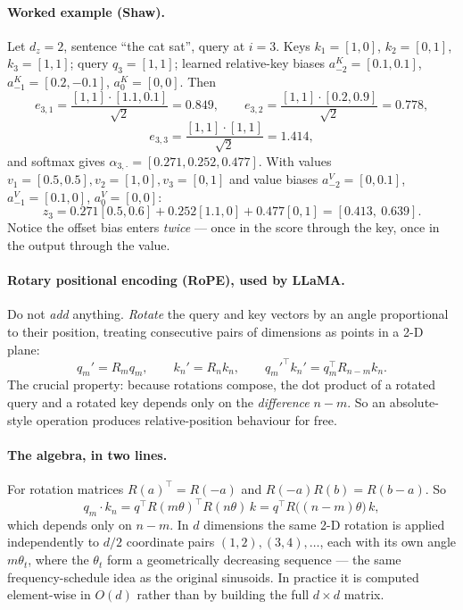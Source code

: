 \documentclass[11pt,a4paper]{article}
\begin{document}
\paragraph{Worked example (Shaw).} Let $d_z = 2$, sentence ``the cat sat'', query at $i = 3$.
Keys $k_1 = [1,0]$, $k_2 = [0,1]$, $k_3 = [1,1]$; query $q_3 = [1,1]$; learned relative-key
biases $a^K_{-2} = [0.1, 0.1]$, $a^K_{-1} = [0.2, -0.1]$, $a^K_{0} = [0,0]$. Then
\[
e_{3,1} = \frac{[1,1]\cdot[1.1, 0.1]}{\sqrt2} = 0.849, \qquad
e_{3,2} = \frac{[1,1]\cdot[0.2, 0.9]}{\sqrt2} = 0.778,
\]
\[
e_{3,3} = \frac{[1,1]\cdot[1,1]}{\sqrt2} = 1.414,
\]
and softmax gives $\alpha_{3,\cdot} = [0.271, 0.252, 0.477]$. With values
$v_1 = [0.5,0.5], v_2 = [1,0], v_3 = [0,1]$ and value biases
$a^V_{-2} = [0, 0.1]$, $a^V_{-1} = [0.1, 0]$, $a^V_0 = [0,0]$:
\[
z_3 = 0.271[0.5, 0.6] + 0.252[1.1, 0] + 0.477[0, 1] = [0.413,\ 0.639].
\]
Notice the offset bias enters \emph{twice} --- once in the score through the key, once in the
output through the value.

\paragraph{Rotary positional encoding (RoPE), used by LLaMA.} Do not \emph{add} anything.
\emph{Rotate} the query and key vectors by an angle proportional to their position, treating
consecutive pairs of dimensions as points in a 2-D plane:
\[
q_m' = R_m q_m, \qquad k_n' = R_n k_n, \qquad
q_m'^\top k_n' = q_m^\top R_{n-m} k_n .
\]
The crucial property: because rotations compose, the dot product of a rotated query and a
rotated key depends only on the \emph{difference} $n - m$. So an absolute-style operation
produces relative-position behaviour for free.

\paragraph{The algebra, in two lines.} For rotation matrices $R(a)^\top = R(-a)$ and
$R(-a)R(b) = R(b-a)$. So
\[
q_m \cdot k_n = q^\top R(m\theta)^\top R(n\theta)\, k = q^\top R\big((n-m)\theta\big)\, k,
\]
which depends only on $n - m$. In $d$ dimensions the same 2-D rotation is applied
independently to $d/2$ coordinate pairs $(1,2), (3,4), \ldots$, each with its own angle
$m\theta_t$, where the $\theta_t$ form a geometrically decreasing sequence --- the same
frequency-schedule idea as the original sinusoids. In practice it is computed element-wise in
$O(d)$ rather than by building the full $d \times d$ matrix.
\end{document}
